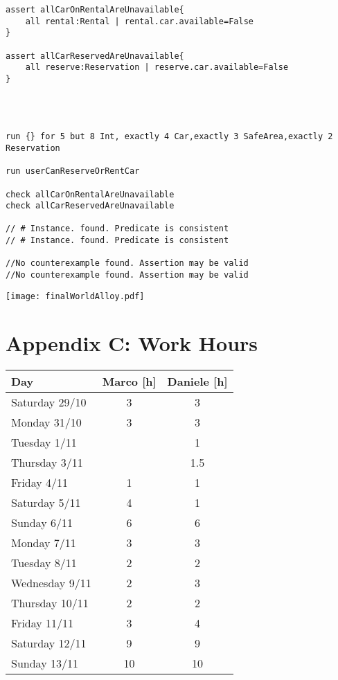 \documentclass{scrreprt}
\begin{document}
\begin{lstlisting}[breaklines]
assert allCarOnRentalAreUnavailable{
	all rental:Rental | rental.car.available=False
}

assert allCarReservedAreUnavailable{
	all reserve:Reservation | reserve.car.available=False
}




run {} for 5 but 8 Int, exactly 4 Car,exactly 3 SafeArea,exactly 2 Reservation

run userCanReserveOrRentCar

check allCarOnRentalAreUnavailable
check allCarReservedAreUnavailable

// # Instance. found. Predicate is consistent
// # Instance. found. Predicate is consistent

//No counterexample found. Assertion may be valid
//No counterexample found. Assertion may be valid

\end{lstlisting}

\begin{center}
\texttt{[image: finalWorldAlloy.pdf]}
\end{center}

\section{Appendix C: Work Hours}
\begin{center}
    \begin{tabular}{lcc}
        \toprule
	   \textbf{ Day }& \textbf{ Marco [h]  }& \textbf{ Daniele [h] }\\
        \midrule
		Saturday 29/10 & 3 & 3\\
		Monday 31/10 & 3 & 3\\
		Tuesday 1/11 & & 1\\
		Thursday 3/11 & &1.5\\
		Friday 4/11 & 1 & 1\\
		Saturday 5/11 & 4 & 1\\
		Sunday 6/11 & 6 & 6\\
		Monday 7/11 & 3 & 3\\
		Tuesday 8/11 & 2 & 2\\
		Wednesday 9/11 &2 &3\\
		Thursday 10/11 & 2 & 2\\
		Friday 11/11 & 3 & 4\\
		Saturday 12/11 & 9 & 9\\
		Sunday 13/11 & 10 & 10\\
	\bottomrule
    \end{tabular}
\end{center}
\end{document}

